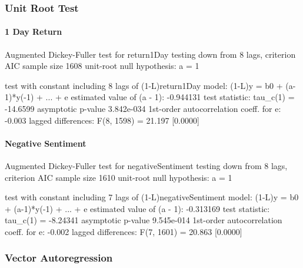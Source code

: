 \subsubsection{Unit Root Test}

\paragraph{1 Day Return}

Augmented Dickey-Fuller test for return1Day
testing down from 8 lags, criterion AIC
sample size 1608
unit-root null hypothesis: a = 1

test with constant
including 8 lags of (1-L)return1Day
model: (1-L)y = b0 + (a-1)*y(-1) + ... + e
estimated value of (a - 1): -0.944131
test statistic: tau\_c(1) = -14.6599
asymptotic p-value 3.842e-034
1st-order autocorrelation coeff. for e: -0.003
lagged differences: F(8, 1598) = 21.197 [0.0000]

\paragraph{Negative Sentiment}

Augmented Dickey-Fuller test for negativeSentiment
testing down from 8 lags, criterion AIC
sample size 1610
unit-root null hypothesis: a = 1

test with constant 
including 7 lags of (1-L)negativeSentiment
model: (1-L)y = b0 + (a-1)*y(-1) + ... + e
estimated value of (a - 1): -0.313169
test statistic: tau\_c(1) = -8.24341
asymptotic p-value 9.545e-014
1st-order autocorrelation coeff. for e: -0.002
lagged differences: F(7, 1601) = 20.863 [0.0000]

\subsubsection{Vector Autoregression}

